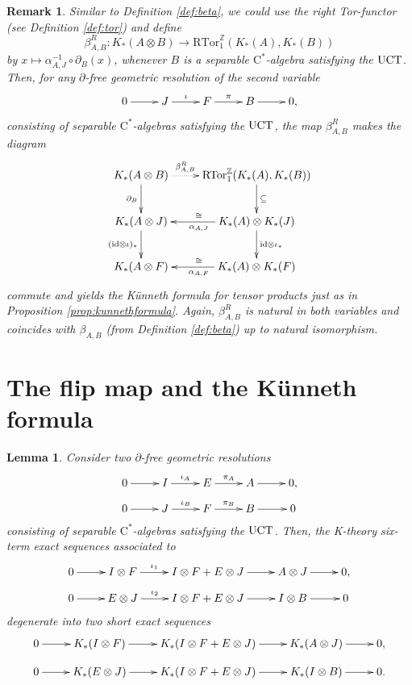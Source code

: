 \documentclass[a4paper,10pt]{amsart}
\newcommand{\T}[1]{\textup{#1}}
\newcommand{\cstar}{\ensuremath{\mathrm C^\ast}}
\newcounter{theorem}
\newtheorem{lemma}[theorem]{Lemma}
\newtheorem{remark}[theorem]{Remark}
\numberwithin{equation}{section}
\numberwithin{theorem}{section}
\newcommand{\RTor}{\mathrm{RTor}_1^{\mathbb Z}}
\newcommand{\id}{\mathrm{id}}
\begin{document}
\begin{remark}
\label{rem:right}
Similar to Definition \ref{def:beta}, we could use the right Tor-functor (see Definition \ref{def:tor}) and define 
    	$$
		\beta_{A,B}^R \colon K_*(A \otimes B) \to \RTor(K_*(A),K_*(B))
	$$
by $x \mapsto \alpha_{A,J}^{-1} \circ \partial_B(x)$, whenever $B$ is a separable  $\cstar$-algebra satisfying the $\T{UCT}$. 
Then, for any $\partial$-free geometric resolution of the second variable
\[
	\xymatrix{
		0 \ar[r] & J \ar[r]^\iota & F \ar[r]^\pi & B \ar[r]  & 0,
	}
\]
consisting of separable  $\cstar$-algebras satisfying the $\T{UCT}$, the map $\beta_{A,B}^R$ makes the diagram
\[
    	\xymatrix{
		K_*(A \otimes B) \ar@{..>}[r]^-{\beta_{A,B}^R} \ar[d]_{ \partial_B}  & \RTor(K_*(A),K_*(B)) \ar[d]^\subseteq \\
		K_*(A \otimes J) \ar[d]_{(\id \otimes \iota)_*} & K_*(A) \otimes K_*(J) \ar[d]^{\id \otimes \iota_*} \ar[l]^{\alpha_{A,J}}_\cong \\
		K_*(A \otimes F) & K_*(A) \otimes K_*(F) \ar[l]^{\alpha_{A,F}}_\cong
	}
\]
commute and yields the K\"unneth formula for tensor products just as in Proposition \ref{prop:kunnethformula}.
Again, $\beta_{A,B}^R$ is natural in both variables and coincides with $\beta_{A,B}$ (from Definition \ref{def:beta})	 up to natural isomorphism.
\end{remark}

\section{The flip map and the K\"unneth formula}

\begin{lemma}
	\label{lem:sum}
	Consider two $\partial$-free geometric resolutions
	\[
		\xymatrix@R-1.5em{
			0 \ar[r] & I \ar[r]^-{\iota_A} & E \ar[r]^-{\pi_A} & A \ar[r] & 0 , \\ 
			0 \ar[r] & J \ar[r]^-{\iota_B} & F \ar[r]^-{\pi_B} & B \ar[r] & 0 
		} 
	\]
	consisting of separable $\cstar$-algebras satisfying the $\T{UCT}$. Then, the K-theory six-term exact sequences associated to
	\[
		\xymatrix@R-1.5em{
			0 \ar[r] & I \otimes F \ar[r]^-{\iota_1} & I \otimes F + E \otimes J \ar[r] & A \otimes J \ar[r] & 0,   \\ 
			0 \ar[r] & E \otimes J \ar[r]^-{\iota_2} & I \otimes F + E \otimes J \ar[r] & I \otimes B \ar[r] & 0 
		}
	\]
	degenerate into two short exact sequences
	\[
		\xymatrix@R-1.5em{
			0 \ar[r] & K_*(I \otimes F) \ar[r] & K_*(I \otimes F + E \otimes J) \ar[r] & K_*(A \otimes J) \ar[r]  &0, \\
				0 \ar[r] & K_*(E \otimes J) \ar[r] & K_*(I \otimes F + E \otimes J) \ar[r] & K_*(I \otimes B) \ar[r]  &0.
		}
	\]
\end{lemma}
\end{document}
